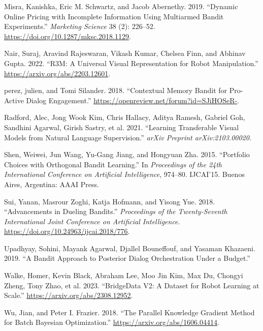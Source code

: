 \documentclass[
  letterpaper,
  numbers=noenddot,
  DIV=11]{scrreprt}
\newlength{\cslhangindent}
\newenvironment{CSLReferences}[2] %
 {\begin{list}{}{%
  \setlength{\itemindent}{0pt}
  \setlength{\leftmargin}{0pt}
  \setlength{\parsep}{0pt}
  \ifodd #1
   \setlength{\leftmargin}{\cslhangindent}
   \setlength{\itemindent}{-1\cslhangindent}
  \fi
  \setlength{\itemsep}{#2\baselineskip}}}
 {\end{list}}
\theoremstyle{plain}
\theoremstyle{definition}
\theoremstyle{remark}
\begin{document}
\begin{CSLReferences}{1}{0}
Misra, Kanishka, Eric M. Schwartz, and Jacob Abernethy. 2019. {``Dynamic
Online Pricing with Incomplete Information Using Multiarmed Bandit
Experiments.''} \emph{Marketing Science} 38 (2): 226--52.
\url{https://doi.org/10.1287/mksc.2018.1129}.

Nair, Suraj, Aravind Rajeswaran, Vikash Kumar, Chelsea Finn, and Abhinav
Gupta. 2022. {``R3M: A Universal Visual Representation for Robot
Manipulation.''} \url{https://arxiv.org/abs/2203.12601}.

perez, julien, and Tomi Silander. 2018. {``Contextual Memory Bandit for
Pro-Active Dialog Engagement.''}
\url{https://openreview.net/forum?id=SJiHOSeR-}.

Radford, Alec, Jong Wook Kim, Chris Hallacy, Aditya Ramesh, Gabriel Goh,
Sandhini Agarwal, Girish Sastry, et al. 2021. {``Learning Transferable
Visual Models from Natural Language Supervision.''} \emph{arXiv Preprint
arXiv:2103.00020}.

Shen, Weiwei, Jun Wang, Yu-Gang Jiang, and Hongyuan Zha. 2015.
{``Portfolio Choices with Orthogonal Bandit Learning.''} In
\emph{Proceedings of the 24th International Conference on Artificial
Intelligence}, 974--80. IJCAI'15. Buenos Aires, Argentina: AAAI Press.

Sui, Yanan, Masrour Zoghi, Katja Hofmann, and Yisong Yue. 2018.
{``Advancements in Dueling Bandits.''} \emph{Proceedings of the
Twenty-Seventh International Joint Conference on Artificial
Intelligence}. \url{https://doi.org/10.24963/ijcai.2018/776}.

Upadhyay, Sohini, Mayank Agarwal, Djallel Bouneffouf, and Yasaman
Khazaeni. 2019. {``A Bandit Approach to Posterior Dialog Orchestration
Under a Budget.''}

Walke, Homer, Kevin Black, Abraham Lee, Moo Jin Kim, Max Du, Chongyi
Zheng, Tony Zhao, et al. 2023. {``BridgeData V2: A Dataset for Robot
Learning at Scale.''} \url{https://arxiv.org/abs/2308.12952}.

Wu, Jian, and Peter I. Frazier. 2018. {``The Parallel Knowledge Gradient
Method for Batch Bayesian Optimization.''}
\url{https://arxiv.org/abs/1606.04414}.


\end{CSLReferences}
\end{document}
